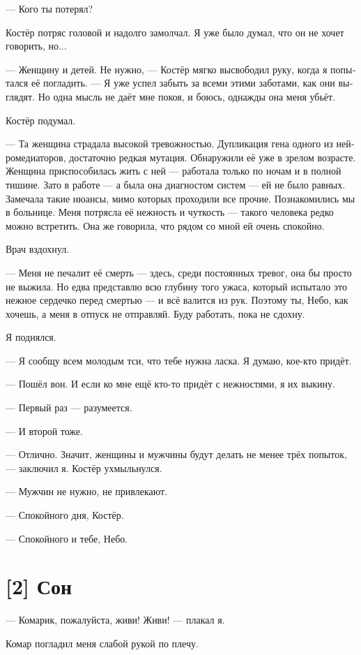 \documentclass[a4paper,12pt,fleqn]{book}\usepackage{cooltooltips}\usepackage{polyglossia}\setdefaultlanguage[babelshorthands=true]{russian}\setotherlanguage{english}\defaultfontfeatures{Ligatures=TeX,Mapping=tex-text} \usepackage{xcolor}\definecolor{lightgray}{HTML}{bbbbbb}\color{lightgray}\newcommand{\ml}[3]{\textenglish{\textcolor{black}{#3}}}
\begin{document}
{--- Кого ты потерял?

Костёр потряс головой и надолго замолчал.
Я уже было думал, что он не хочет говорить, но...

--- Женщину и детей.
Не нужно, --- Костёр мягко высвободил руку, когда я попытался её погладить.
--- Я уже успел забыть за всеми этими заботами, как они выглядят.
Но одна мысль не даёт мне покоя, и боюсь, однажды она меня убьёт.

Костёр подумал.

--- Та женщина страдала высокой тревожностью.
Дупликация гена одного из нейромедиаторов, достаточно редкая мутация.
Обнаружили её уже в зрелом возрасте.
Женщина приспособилась жить с ней --- работала только по ночам и в полной тишине.
Зато в работе --- а была она диагностом систем --- ей не было равных.
Замечала такие нюансы, мимо которых проходили все прочие.
Познакомились мы в больнице.
Меня потрясла её нежность и чуткость --- такого человека редко можно встретить.
Она же говорила, что рядом со мной ей очень спокойно.

Врач вздохнул.

--- Меня не печалит её смерть --- здесь, среди постоянных тревог, она бы просто не выжила.
Но едва представлю всю глубину того ужаса, который испытало это нежное сердечко перед смертью --- и всё валится из рук.
Поэтому ты, Небо, как хочешь, а меня в отпуск не отправляй.
Буду работать, пока не сдохну.

Я поднялся.

--- Я сообщу всем молодым тси, что тебе нужна ласка.
Я думаю, кое-кто придёт.

--- Пошёл вон.
И если ко мне ещё кто-то придёт с нежностями, я их выкину.

--- Первый раз --- разумеется.

--- И второй тоже.

--- Отлично.
Значит, женщины и мужчины будут делать не менее трёх попыток, --- заключил я.
Костёр ухмыльнулся.

--- Мужчин не нужно, не привлекают.

--- Спокойного дня, Костёр.

--- Спокойного и тебе, Небо.

\section{[2] Сон}

--- Комарик, пожалуйста, живи!
Живи! --- плакал я.

Комар погладил меня слабой рукой по плечу.

}
\end{document}
